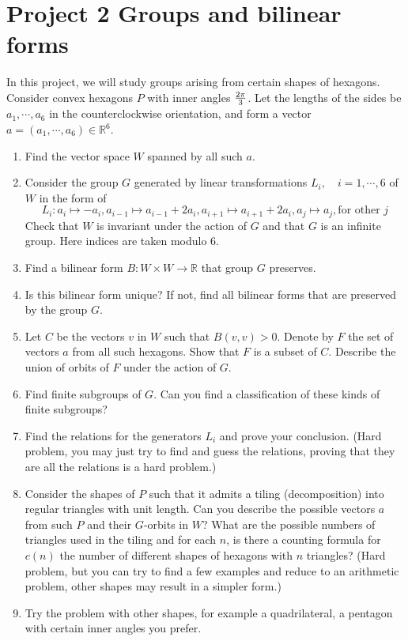 \documentclass[12pt]{article}
\newcommand\R{\mathbb{R}}
\theoremstyle{definition}
\theoremstyle{remark}
\begin{document}
\section{Project 2 Groups and bilinear forms}
In this project, we will study groups arising from certain shapes of hexagons. Consider convex hexagons $P$ with inner angles $2\pi\over 3$. Let the lengths of the sides be $a_1, \cdots, a_6$ in the counterclockwise orientation, and form a vector $a=(a_1, \cdots, a_6)\in \R^6$. 
\begin{enumerate}
\item Find the vector space $W$ spanned by all such $a$.
\item Consider the group $G$ generated by linear transformations $L_i, \quad i=1, \cdots, 6$ of $W$ in the form of $$L_i\colon a_i\mapsto -a_i, a_{i-1}\mapsto a_{i-1}+2a_i, a_{i+1}\mapsto a_{i+1}+2a_i, a_j\mapsto a_j, \text{for other }j$$
  Check that $W$ is invariant under the action of $G$ and that $G$ is an infinite group. Here indices are taken modulo $6$.
\item Find a bilinear form $B\colon W\times W\to \R$ that group $G$ preserves.
\item Is this bilinear form unique? If not, find all bilinear forms that are preserved by the group $G$.

\item Let $C$ be the vectors $v$ in $W$ such that $B(v, v)> 0$. Denote by $F$ the set of vectors $a$ from all such hexagons. Show that $F$ is a subset of $C$. Describe the union of orbits of $F$ under the action of $G$. 

\item Find finite subgroups of $G$. Can you find a classification of these kinds of finite subgroups?

\item Find the relations for the generators $L_i$ and prove your conclusion. (Hard problem, you may just try to find and guess the relations, proving that they are all the relations is a hard problem.)

\item Consider the shapes of $P$ such that it admits a tiling (decomposition) into regular triangles with unit length. Can you describe the possible vectors $a$ from such $P$ and their $G$-orbits in $W$? What are the possible numbers of triangles used in the tiling and for each $n$, is there a counting formula for $c(n)$ the number of different shapes of hexagons with $n$ triangles? (Hard problem, but you can try to find a few examples and reduce to an arithmetic problem, other shapes may result in a simpler form.)

\item Try the problem with other shapes, for example a quadrilateral, a pentagon with certain inner angles you prefer.

\end{enumerate}
\end{document}
